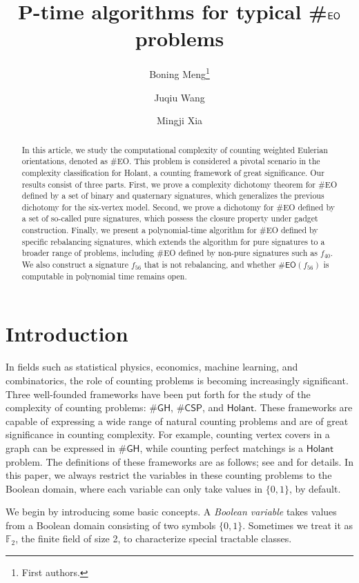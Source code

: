 \documentclass[a4paper,UKenglish,cleveref, autoref, thm-restate]{lipics-v2021}
\title{P-time algorithms for typical \#$\textsf{EO}$ problems}
\author{Boning Meng\footnote{First authors.}}{Key Laboratory of System Software (Chinese Academy of Sciences) and State Key Laboratory of Computer Science, Institute of Software, Chinese Academy of Sciences; University of Chinese Academy of Sciences, Beijing, China}{mengbn@ios.ac.cn}{https://orcid.org/0009-0006-0088-1639}{}
\author{Juqiu Wang\footnotemark[1]}{Key Laboratory of System Software (Chinese Academy of Sciences) and State Key Laboratory of Computer Science, Institute of Software, Chinese Academy of Sciences; University of Chinese Academy of Sciences, Beijing, China}{wangjq21@ios.ac.cn}{https://orcid.org/0000-0001-9801-271X}{}
\author{Mingji Xia\footnotemark[1]}{Key Laboratory of System Software (Chinese Academy of Sciences) and State Key Laboratory of Computer Science, Institute of Software, Chinese Academy of Sciences; University of Chinese Academy of Sciences, Beijing, China}{mingji@ios.ac.cn}{https://orcid.org/0000-0002-3868-9910}{}
\newcommand{\hol}[0]{\textsf{Holant}}
\newcommand{\csp}[0]{\textsf{CSP}}
\begin{document}
\maketitle

\begin{abstract}
In this article, we study the computational complexity of counting weighted Eulerian orientations, denoted as \#\textsf{EO}. This problem is considered a pivotal scenario in the complexity classification for \textsf{Holant}, a counting framework of great significance. Our results consist of three parts. First, we prove a complexity dichotomy theorem for \#\textsf{EO} defined by a set of binary and quaternary signatures, which generalizes the previous dichotomy for the six-vertex model. Second, we prove a dichotomy for \#\textsf{EO} defined by a set of so-called pure signatures, which possess the closure property under gadget construction. Finally, we present a polynomial-time algorithm for \#\textsf{EO} defined by specific rebalancing signatures, which extends the algorithm for pure signatures to a broader range of problems, including \#\textsf{EO} defined by non-pure signatures such as $f_{40}$. We also construct a signature $f_{56}$ that is not rebalancing, and whether $\#\textsf{EO}(f_{56})$ is computable in polynomial time remains open.  
\end{abstract}



\section{Introduction}
In fields such as statistical physics, economics, machine learning, and combinatorics, the role of counting problems is becoming increasingly significant. Three well-founded frameworks have been put forth for the study of the complexity of counting problems: \#$\textsf{GH}$, $\#\csp$, and $\hol$. These frameworks are capable of expressing a wide range of natural counting problems and are of great significance in counting complexity. For example, counting vertex covers in a graph can be expressed in \#$\textsf{GH}$, while counting perfect matchings is a $\hol$ problem. The definitions of these frameworks are as follows; see \cite[Section 1.2]{cai2017complexity} and \cite[section 2.1]{cai2020beyond} for details. In this paper, we always restrict the variables in these counting problems to the Boolean domain, where each variable can only take values in $\{0,1\}$, by default.  

We begin by introducing some basic concepts. A \textit{Boolean variable} takes values from a Boolean domain consisting of two symbols $\{0,1\}$. Sometimes we treat it as $\mathbb{F}_2$, the finite field of size 2, to characterize special tractable classes.
\end{document}
